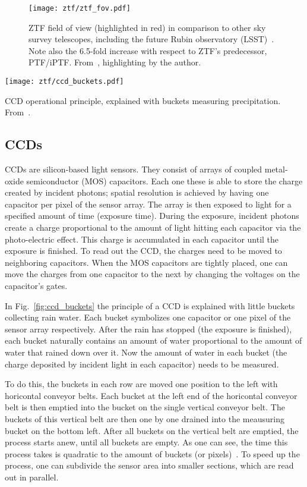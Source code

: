 \begin{figure}[htb]
    \texttt{[image: ztf/ztf\_fov.pdf]}
    \caption[ZTF field of view]{ZTF field of view (highlighted in red) in comparison to other sky survey telescopes, including the future Rubin observatory (LSST)~\cite{Ivezic2019}. Note also the 6.5-fold increase with respect to ZTF's predecessor, PTF/iPTF. From~\cite{Laher2018}, highlighting by the author.}
\end{figure}

\begin{marginfigure}
    \texttt{[image: ztf/ccd\_buckets.pdf]}
    \caption[CCD operational principle]{CCD operational principle, explained with buckets measuring precipitation. From~\cite{Janesick1987}.}
\end{marginfigure}

\subsection{CCDs}\label{ccd}
CCDs are silicon-based light sensors. They consist of arrays of coupled metal-oxide semiconductor (MOS) capacitors. Each one these is able to store the charge created by incident photons; spatial resolution is achieved by having one capacitor per pixel of the sensor array. The array is then exposed to light for a specified amount of time (exposure time). During the exposure, incident photons create a charge proportional to the amount of light hitting each capacitor via the photo-electric effect. This charge is accumulated in each capacitor until the exposure is finished. To read out the CCD, the charges need to be moved to neighboring capacitors. When the MOS capacitors are tightly placed, one can move the charges from one capacitor to the next by changing the voltages on the capacitor's gates.

In Fig.~\ref{fig:ccd_buckets} the principle of a CCD is explained with little buckets collecting rain water. Each bucket symbolizes one capacitor or one pixel of the sensor array respectively. After the rain has stopped (the exposure is finished), each bucket naturally contains an amount of water proportional to the amount of water that rained down over it. Now the amount of water in each bucket (the charge deposited by incident light in each capacitor) needs to be measured.

To do this, the buckets in each row are moved one position to the left with horicontal conveyor belts. Each bucket at the left end of the horicontal conveyor belt is then emptied into the bucket on the single vertical conveyor belt. The buckets of this vertical belt are then one by one drained into the meausuring bucket on the bottom left. After all buckets on the vertical belt are emptied, the process starts anew, until all buckets are empty. As one can see, the time this process takes is quadratic to the amount of buckets (or pixels)~. To speed up the process, one can subdivide the sensor area into smaller sections, which are read out in parallel.

